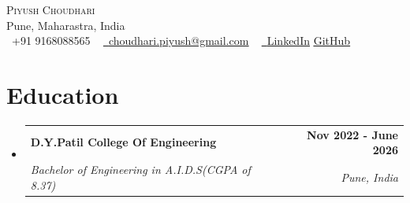 \documentclass[letterpaper,11pt]{article}
\makeatletter
\newcommand{\resumeItem}[1]{
  \item\small{
	{#1 \vspace{-2pt}}
  }
}
\newcommand{\resumeSubheading}[4]{
  \vspace{-2pt}\item
	\begin{tabular*}{1.0\textwidth}[t]{l@{\extracolsep{\fill}}r}
  	\textbf{#1} & \textbf{\small #2} \\
  	\textit{\small#3} & \textit{\small #4} \\
	\end{tabular*}\vspace{-7pt}
}
\newcommand{\resumeSubHeadingListStart}{\begin{itemize}[leftmargin=0.0in, label={}]}
\newcommand{\resumeSubHeadingListEnd}{\end{itemize}}
\newcommand{\resumeItemListStart}{\begin{itemize}}
\newcommand{\resumeItemListEnd}{\end{itemize}\vspace{-5pt}}
\makeatother
\begin{document}

\begin{center}
	{\Huge \scshape Piyush Choudhari} \\ \vspace{1pt}
	Pune, Maharastra, India \\ \vspace{1.5pt}
	\small \raisebox{-0.1\height}\faPhone\ +91 9168088565 ~ \href{mailto:choudhari.piyush@gmail.com}{\raisebox{-0.2\height}\faEnvelope\  \underline{choudhari.piyush@gmail.com}} ~
	\href{https://www.linkedin.com/in/piyush-choudhari/}{\raisebox{-0.2\height}\faLinkedin\ \underline{LinkedIn}}
	\href{https://github.com/capybara-brain346}{\raisebox{-0.2\height}\faGithubSquare \underline{ GitHub}}
	
    \vspace{-8pt}
\end{center}


\section{Education}
  \resumeSubHeadingListStart
	\resumeSubheading
  	{D.Y.Patil College Of Engineering}{Nov 2022 - June 2026}
  	{Bachelor of Engineering in A.I.D.S(CGPA of 8.37)} {Pune, India}
  \resumeSubHeadingListEnd


    
\end{document}
